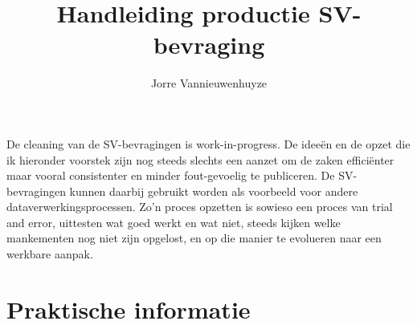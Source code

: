 \documentclass{VSAnote}
\begin{document}
\title{Handleiding productie SV-bevraging}
\author{Jorre Vannieuwenhuyze}
\titlepage

\tableofcontents



De cleaning van de SV-bevragingen is work-in-progress. De ideeën en de opzet die ik hieronder voorstek zijn nog steeds slechts een aanzet om de zaken efficiënter maar vooral consistenter en minder fout-gevoelig te publiceren. De SV-bevragingen kunnen daarbij gebruikt worden als voorbeeld voor andere dataverwerkingsprocessen. Zo'n proces opzetten is sowieso een proces van trial and error, uittesten wat goed werkt en wat niet, steeds kijken welke mankementen nog niet zijn opgelost, en op die manier te evolueren naar een werkbare aanpak. 


\section{Praktische informatie}
\end{document}
